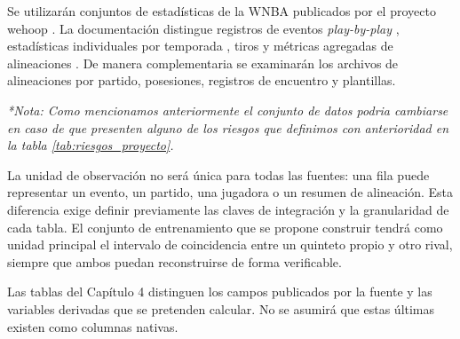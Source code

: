 Se utilizarán conjuntos de estadísticas de la WNBA publicados por el proyecto wehoop \cite{wehoopRepositorio}. La documentación distingue registros de eventos \textit{play-by-play} \cite{wehoopPbp}, estadísticas individuales por temporada \cite{wehoopPlayerSeason}, tiros \cite{wehoopShots} y métricas agregadas de alineaciones \cite{wehoopLineups}. De manera complementaria se examinarán los archivos de alineaciones por partido, posesiones, registros de encuentro y plantillas.

\textit{*Nota: Como mencionamos anteriormente el conjunto de datos podria cambiarse en caso de que presenten alguno de los riesgos que definimos con anterioridad en la tabla \ref{tab:riesgos_proyecto}.}

La unidad de observación no será única para todas las fuentes: una fila puede representar un evento, un partido, una jugadora o un resumen de alineación. Esta diferencia exige definir previamente las claves de integración y la granularidad de cada tabla. El conjunto de entrenamiento que se propone construir tendrá como unidad principal el intervalo de coincidencia entre un quinteto propio y otro rival, siempre que ambos puedan reconstruirse de forma verificable.

Las tablas del Capítulo 4 distinguen los campos publicados por la fuente y las variables derivadas que se pretenden calcular. No se asumirá que estas últimas existen como columnas nativas.